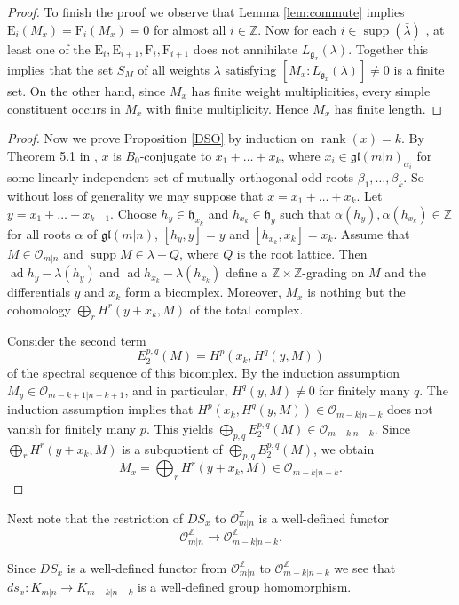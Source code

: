 \documentclass[12pt,oneside,english]{amsart}
\numberwithin{equation}{section}
\numberwithin{figure}{section}
\theoremstyle{plain}
\theoremstyle{plain}
\theoremstyle{remark}
\theoremstyle{definition}
\theoremstyle{plain}
\theoremstyle{remark}
\theoremstyle{definition}
\theoremstyle{plain}
\theoremstyle{plain}
\theoremstyle{definition}
\newcommand{\fg}{\mathfrak{g}}
\newcommand{\fh}{\mathfrak{h}}
\begin{document}
\begin{proof}
To finish the proof we observe that Lemma \ref{lem:commute} implies $\mathrm{E}_i(M_x)=\mathrm{F}_i(M_x)=0$ for almost all $i\in\mathbb Z$. Now for each $i\in\operatorname{supp}(\bar\lambda)$ , at least one of the $\mathrm{E}_i,\mathrm{E}_{i+1},\mathrm{F}_i,\mathrm{F}_{i+1}$
 does not annihilate $L_{\fg_x}(\lambda)$. Together this implies that the set $S_M$ of all weights $\lambda$  satisfying $[M_x:L_{\fg_x}(\lambda)]\neq 0$ is a finite set. On the other hand, since $M_x$ has finite weight multiplicities, every simple constituent occurs in $M_x$
 with finite multiplicity. Hence  $M_x$ has finite length.
\end{proof}
  \begin{proof} Now we prove Proposition \ref{DSO} by induction on $\operatorname{rank}(x)=k$. By Theorem 5.1 in \cite{CS},  $x$ is $B_0$-conjugate to $x_1+\dots+x_k$, where $x_i\in\mathfrak{gl}(m|n)_{\alpha_i}$ for
  some linearly independent set of mutually orthogonal odd roots $\beta_1,\dots,\beta_k$. So without loss of generality we may suppose that
  $x=x_1+\dots+x_k$. Let $y=x_1+\dots+x_{k-1}$. Choose  $h_y\in \fh_{x_k}$ and $h_{x_k}\in \fh_y$  such that  $\alpha(h_y),\alpha(h_{x_k})\in \mathbb Z$ for all roots $\alpha$ of $\mathfrak{gl}(m|n)$,
  $[h_y,y]=y$ and $[h_{x_k},x_k]=x_k$. Assume that $M\in\mathcal O_{m|n}$ and $\operatorname{supp}M\in\lambda +Q$, where $Q$ is the root lattice. Then $\operatorname{ad}h_y-\lambda(h_y)$ and $\operatorname{ad}h_{x_k}-\lambda(h_{x_k})$ define a
  $\mathbb Z\times\mathbb Z$-grading on $M$ and the differentials $y$ and $x_k$ form a bicomplex. Moreover, $M_x$ is nothing but the cohomology
  $\bigoplus_r H^r(y+x_k,M)$ of the total complex.

  Consider the second term
  $$E_2^{p,q}(M)=H^p(x_k,H^q(y,M))$$
  of the spectral sequence of this bicomplex.
  By the induction assumption $M_y\in \mathcal O_{m-k+1|n-k+1}$, and in particular, $H^q(y,M)\neq 0$ for finitely many $q$.
  The induction assumption implies that $H^p  (x_k,H^q(y,M))\in\mathcal O_{m-k|n-k}$ does not vanish
  for finitely many $p$. This yields $\bigoplus_{p,q} E_2^{p,q}(M)\in \mathcal O_{m-k|n-k}$. Since $\bigoplus_r H^r(y+x_k,M)$ is a subquotient of
  $\bigoplus_{p,q} E_2^{p,q}(M)$, we obtain
  $$M_x=\bigoplus_r H^r(y+x_k,M)\in\mathcal{O}_{m-k|n-k}.$$
\end{proof}
Next note that the restriction of $DS_x$ to $\mathcal O^{\mathbb Z}_{m|n}$ is a well-defined functor
  $$\mathcal O^{\mathbb Z}_{m|n}\to \mathcal O^{\mathbb Z}_{m-k|n-k}.$$

Since $DS_{x}$ is a well-defined functor from $\mathcal {O}_{m|n}^{\mathbb Z} $ to $\mathcal {O}_{m-k|n-k}^{\mathbb Z} $ we see that  $ds_x:K_{m|n}\rightarrow K_{m-k|n-k}$ is a well-defined group homomorphism.
\end{document}
